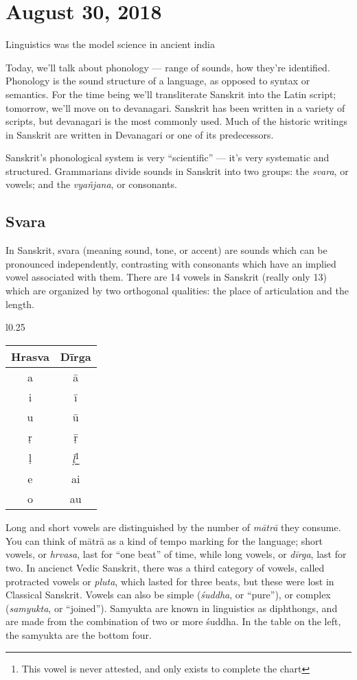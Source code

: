 \section{August 30, 2018}

Linguistics was the model science in ancient india

Today, we'll talk about phonology --- range of sounds, how they're identified.
Phonology is the sound structure of a language, as opposed to syntax or semantics. For the time being we'll transliterate Sanskrit into the Latin script; tomorrow, we'll move on to devanagari. Sanskrit has been written in a variety of scripts, but devanagari is the most commonly used.
Much of the historic writings in Sanskrit are written in Devanagari or one of its predecessors.

Sanskrit's phonological system is very ``scientific'' --- it's very systematic and structured. Grammarians divide sounds in Sanskrit into two groups: the \emph{svara}, or vowels; and the \emph{vyañjana}, or consonants.

\subsection*{Svara}
In Sanskrit, svara (meaning sound, tone, or accent) are sounds which can be pronounced independently, contrasting with consonants which have an implied vowel associated with them.
There are 14 vowels in Sanskrit (really only 13) which are organized by two orthogonal qualities: the place of articulation and the length.

\begin{wrapfigure}{l}{0.25\textwidth}
\begin{tabular}{@{}cc@{}}
\toprule
Hrasva & Dīrga \\
\midrule
a & ā \\
i & ī \\
u & ū \\
ṛ & ṝ \\
ḷ & \emph{ḹ}\footnote{This vowel is never attested, and only exists to complete the chart} \\
\midrule
e & ai \\
o & au \\
\bottomrule
\end{tabular}
\end{wrapfigure}

Long and short vowels are distinguished by the number of \emph{mātrā} they consume.
You can think of mātrā as a kind of tempo marking for the language; short vowels, or \emph{hrvasa}, last for ``one beat'' of time, while long vowels, or \emph{dīrga}, last for two. In ancienct Vedic Sanskrit, there was a third category of vowels, called protracted vowels or \emph{pluta}, which lasted for three beats, but these were lost in Classical Sanskrit.
Vowels can also be simple (\emph{śuddha}, or ``pure''), or complex (\emph{samyukta}, or ``joined''). Samyukta are known in linguistics as diphthongs, and are made from the combination of two or more śuddha. In the table on the left, the samyukta are the bottom four.

